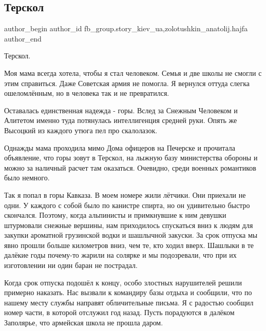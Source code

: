  
 
 
 
 
 
\subsection{Терскол}
\label{sec:26_01_2022.fb.fb_group.story_kiev_ua.2.terskol}
 
\ifcmt
 author_begin
   author_id fb_group.story_kiev_ua,zolotushkin_anatolij.hajfa
 author_end
\fi

Терскол.

Моя мама всегда хотела, чтобы я стал человеком. Семья и две школы не смогли с
этим справиться. Даже Советская армия не помогла. Я вернулся оттуда слегка
ошеломлённым, но в человека так и не превратился.

Оставалась единственная надежда - горы. Вслед за Снежным Человеком и Алитетом
именно туда потянулась интеллигенция средней руки. Опять же Высоцкий из каждого
утюга пел про скалолазок.

Однажды мама проходила мимо Дома офицеров на Печерске и прочитала объявление,
что горы зовут в Терскол, на лыжную базу министерства обороны и можно за
наличный расчет там оказаться. Очевидно, среди военных романтиков было немного.

Так я попал в горы Кавказа. В моем номере жили лётчики. Они приехали не одни. У
каждого с собой было по канистре спирта, но он удивительно быстро скончался.
Поэтому, когда альпинисты и примкнувшие к ним девушки штурмовали снежные
вершины, нам приходилось спускаться вниз к людям для закупки ароматной
грузинской водки и шашлычной закуски. За срок отпуска мы явно прошли больше
километров вниз, чем те, кто ходил вверх. Шашлыки в те далёкие годы почему-то
жарили на солярке и мы подозревали, что при их изготовлении ни один баран не
пострадал.

Когда срок отпуска подошёл к концу, особо злостных нарушителей решили примерно
наказать. Нас вызвали к командиру базы отдыха и сообщили, что по нашему месту
службы направят обличительные письма. Я с радостью сообщил номер части, в
которой отслужил год назад. Пусть порадуются в далёком Заполярье, что армейская
школа не прошла даром.

